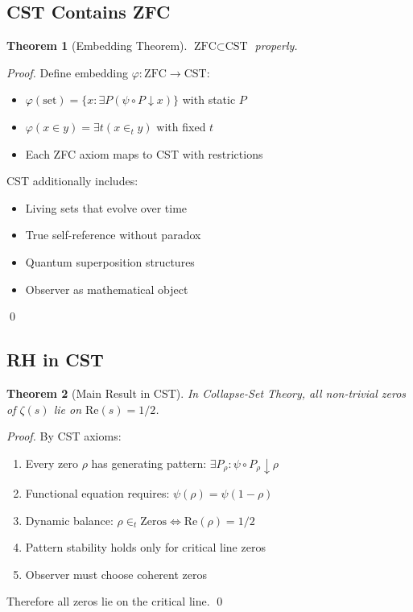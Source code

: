\documentclass[12pt]{article}
\newtheorem{theorem}{Theorem}[section]
\newcommand{\CST}{\text{CST}}
\newcommand{\ZFC}{\text{ZFC}}
\begin{document}
\subsection{CST Contains ZFC}

\begin{theorem}[Embedding Theorem]
$\ZFC \subset \CST$ properly.
\end{theorem}

\begin{proof}
Define embedding $\varphi: \ZFC \to \CST$:
\begin{itemize}
\item $\varphi(\text{set}) = \{x : \exists P (\psi \circ P \downarrow x)\}$ with static $P$
\item $\varphi(x \in y) = \exists t (x \in_t y)$ with fixed $t$
\item Each ZFC axiom maps to CST with restrictions
\end{itemize}

CST additionally includes:
\begin{itemize}
\item Living sets that evolve over time
\item True self-reference without paradox
\item Quantum superposition structures
\item Observer as mathematical object
\end{itemize}
\qed
\end{proof}

\subsection{RH in CST}

\begin{theorem}[Main Result in CST]
In Collapse-Set Theory, all non-trivial zeros of $\zeta(s)$ lie on $\text{Re}(s) = 1/2$.
\end{theorem}

\begin{proof}
By CST axioms:
\begin{enumerate}
\item Every zero $\rho$ has generating pattern: $\exists P_\rho : \psi \circ P_\rho \downarrow \rho$
\item Functional equation requires: $\psi(\rho) = \psi(1-\rho)$
\item Dynamic balance: $\rho \in_t \text{Zeros} \Leftrightarrow \text{Re}(\rho) = 1/2$
\item Pattern stability holds only for critical line zeros
\item Observer must choose coherent zeros
\end{enumerate}
Therefore all zeros lie on the critical line. \qed
\end{proof}
\end{document}
